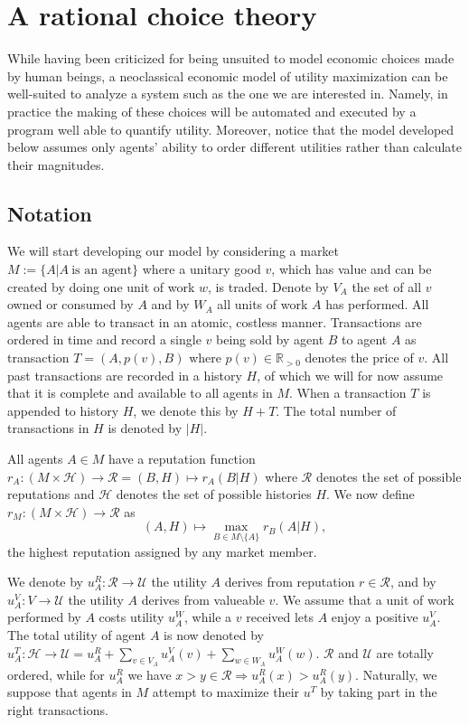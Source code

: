\chapter{A rational choice theory}
While having been criticized for being unsuited to model economic choices made by human beings, a neoclassical economic model of utility maximization can be well-suited to analyze a system such as the one we are interested in. Namely, in practice the making of these choices will be automated and executed by a program well able to quantify utility. Moreover, notice that the model developed below assumes only agents' ability to order different utilities rather than calculate their magnitudes.

\section{Notation}
We will start developing our model by considering a market $M := \{ A | A \ \text{is an agent} \}$ where a unitary good $v$, which has value and can be created by doing one unit of work $w$, is traded. Denote by $V_A$ the set of all $v$ owned or consumed by $A$ and by $W_A$ all units of work $A$ has performed. All agents are able to transact in an atomic, costless manner. Transactions are ordered in time and record a single $v$ being sold by agent $B$ to agent $A$ as transaction $T = (A, p(v), B)$ where $p(v) \in \mathds{R}_{>0}$ denotes the price of $v$. All past transactions are recorded in a history $H$, of which we will for now assume that it is complete and available to all agents in $M$. When a transaction $T$ is appended to history $H$, we denote this by $H + T$. The total number of transactions in $H$ is denoted by $|H|$.

All agents $A \in M$ have a reputation function $r_A: (M \times \mathcal{H}) \to \mathcal{R} = (B, H) \mapsto r_A(B | H)$ where $\mathcal{R}$ denotes the set of possible reputations and $\mathcal{H}$ denotes the set of possible histories $H$. We now define $r_M: (M \times \mathcal{H}) \to \mathcal{R}$ as
\[(A, H) \mapsto \max_{B \in M \setminus \{ A \}} r_B(A | H),\]
the highest reputation assigned by any market member.

We denote by $u^R_A: \mathcal{R} \to \mathcal{U}$ the utility $A$ derives from reputation $r \in \mathcal{R}$, and by $u^V_A: V \to \mathcal{U}$ the utility $A$ derives from valueable $v$. We assume that a unit of work performed by $A$ costs utility $u^W_A$, while a $v$ received lets $A$ enjoy a positive $u^V_A$. The total utility of agent $A$ is now denoted by $u^T_A: \mathcal{H} \to \mathcal{U} = u^R_A + \sum_{v \in V_A} u^V_A(v) + \sum_{w \in W_A} u^W_A(w)$. $\mathcal{R}$ and $\mathcal{U}$ are totally ordered, while for $u^R_A$ we have $x > y \in \mathcal{R} \Rightarrow u^R_A(x) > u^R_A(y)$. Naturally, we suppose that agents in $M$ attempt to maximize their $u^T$ by taking part in the right transactions.

